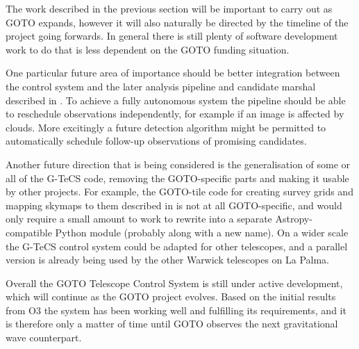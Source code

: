 \begin{colsection}
\begin{colsection}
The work described in the previous section will be important to carry out as GOTO expands, however it will also naturally be directed by the timeline of the project going forwards. In general there is still plenty of software development work to do that is less dependent on the GOTO funding situation.

One particular future area of importance should be better integration between the control system and the later analysis pipeline and candidate marshal described in
.
To achieve a fully autonomous system the pipeline should be able to reschedule observations independently, for example if an image is affected by clouds. More excitingly a future detection algorithm might be permitted to automatically schedule follow-up observations of promising candidates.

Another future direction that is being considered is the generalisation of some or all of the G-TeCS code, removing the GOTO-specific parts and making it usable by other projects. For example, the GOTO-tile code for creating survey grids and mapping skymaps to them described in
is not at all GOTO-specific, and would only require a small amount to work to rewrite into a separate Astropy-compatible Python module (probably along with a new name). On a wider scale the G-TeCS control system could be adapted for other telescopes, and a parallel version is already being used by the other Warwick telescopes on La Palma.

Overall the GOTO Telescope Control System is still under active development, which will continue as the GOTO project evolves. Based on the initial results from O3 the system has been working well and fulfilling its requirements, and it is therefore only a matter of time until GOTO observes the next gravitational wave counterpart.

\end{colsection}


\end{colsection}

